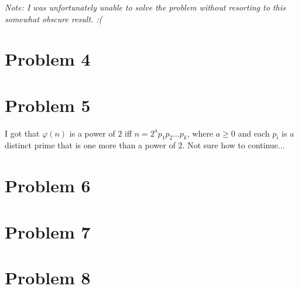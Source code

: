 \documentclass{scrartcl}
\begin{document}
\textit{Note: I was unfortunately unable to solve the problem without resorting to this somewhat obscure result. :(}
\pagebreak
\section*{Problem 4}

\pagebreak
\section*{Problem 5}
I got that $\varphi(n)$ is a power of $2$ iff $n = 2^a p_1p_2\ldots p_k$, where $a \geq 0$ and each $p_i$ is a distinct prime that is one more than a power of $2$. Not sure how to continue...
\pagebreak
\section*{Problem 6}

\pagebreak
\section*{Problem 7}

\pagebreak
\section*{Problem 8}

\pagebreak
\end{document}
